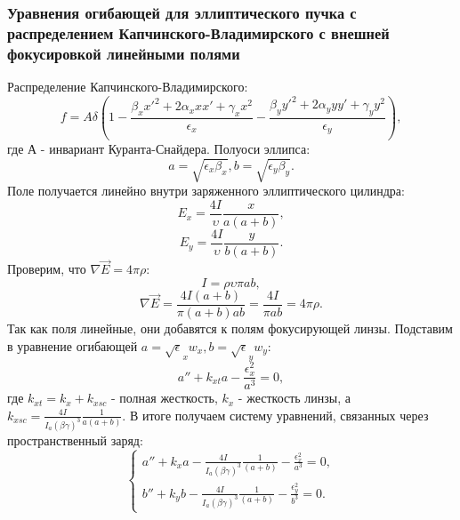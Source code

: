 \documentclass[11pt]{article}
\begin{document}
    \hypertarget{ux443ux440ux430ux432ux43dux435ux43dux438ux44f-ux43eux433ux438ux431ux430ux44eux449ux435ux439-ux434ux43bux44f-ux44dux43bux43bux438ux43fux442ux438ux447ux435ux441ux43aux43eux433ux43e-ux43fux443ux447ux43aux430-ux441-ux440ux430ux441ux43fux440ux435ux434ux435ux43bux435ux43dux438ux435ux43c-ux43aux430ux43fux447ux438ux43dux441ux43aux43eux433ux43e-ux432ux43bux430ux434ux438ux43cux438ux440ux441ux43aux43eux433ux43e-ux441-ux432ux43dux435ux448ux43dux435ux439-ux444ux43eux43aux443ux441ux438ux440ux43eux432ux43aux43eux439-ux43bux438ux43dux435ux439ux43dux44bux43cux438-ux43fux43eux43bux44fux43cux438}{%
\subsubsection{Уравнения огибающей для эллиптического пучка с
распределением Капчинского-Владимирского с внешней фокусировкой
линейными
полями}\label{ux443ux440ux430ux432ux43dux435ux43dux438ux44f-ux43eux433ux438ux431ux430ux44eux449ux435ux439-ux434ux43bux44f-ux44dux43bux43bux438ux43fux442ux438ux447ux435ux441ux43aux43eux433ux43e-ux43fux443ux447ux43aux430-ux441-ux440ux430ux441ux43fux440ux435ux434ux435ux43bux435ux43dux438ux435ux43c-ux43aux430ux43fux447ux438ux43dux441ux43aux43eux433ux43e-ux432ux43bux430ux434ux438ux43cux438ux440ux441ux43aux43eux433ux43e-ux441-ux432ux43dux435ux448ux43dux435ux439-ux444ux43eux43aux443ux441ux438ux440ux43eux432ux43aux43eux439-ux43bux438ux43dux435ux439ux43dux44bux43cux438-ux43fux43eux43bux44fux43cux438}}

    Распределение Капчинского-Владимирского: \[
f = A\delta(1 - \displaystyle\frac{\beta_x x'^2 + 2\alpha_x x x' + \gamma_x x^2}{\epsilon_x} - \displaystyle\frac{\beta_y y'^2 + 2\alpha_y y y' + \gamma_y y^2}{\epsilon_y} ),
\] где \(А\) - инвариант Куранта-Снайдера. Полуоси эллипса: \[
a = \sqrt{\epsilon_x \beta_x}, b = \sqrt{\epsilon_y \beta_y}. 
\] Поле получается линейно внутри заряженного эллиптического цилиндра:
\[
E_x = \displaystyle \frac{4I}{\upsilon}\frac{x}{a(a+b)},
\] \[
E_y = \displaystyle \frac{4I}{\upsilon}\frac{y}{b(a+b)}.
\] Проверим, что \(\nabla \vec{E} = 4\pi\rho:\) \[
\displaystyle I = \rho \upsilon \pi ab,
\] \[
\nabla \vec{E} = \displaystyle \frac{4I(a+b)}{\pi(a+b)ab} = \displaystyle \frac{4I}{\pi ab} = 4\pi\rho.
\] Так как поля линейные, они добавятся к полям фокусирующей линзы.
Подставим в уравнение огибающей
\(\displaystyle a = \sqrt \epsilon_x w_x, b = \sqrt \epsilon_y w_y:\) \[
a'' + k_{xt} a - \frac{\epsilon_x^2}{a^3} = 0,
\] где \(k_{xt} = k_x + k_{xsc}\) - полная жесткость, \(k_x\) -
жесткость линзы, а
\(\displaystyle k_{xsc} = \frac{4I}{I_a (\beta\gamma)^3}\frac{1}{a(a+b)}.\)
В итоге получаем систему уравнений, связанных через пространственный
заряд: \[
\begin{equation*}
 \begin{cases}
   \displaystyle a'' + k_xa - \frac{4I}{I_a (\beta\gamma)^3}\frac{1}{(a+b)} - \frac{\epsilon_x^2}{a^3} = 0 ,
   \\
   \displaystyle b'' + k_yb - \frac{4I}{I_a (\beta\gamma)^3}\frac{1}{(a+b)} - \frac{\epsilon_y^2}{b^3} = 0.
 \end{cases}
\end{equation*}
\]
\end{document}
